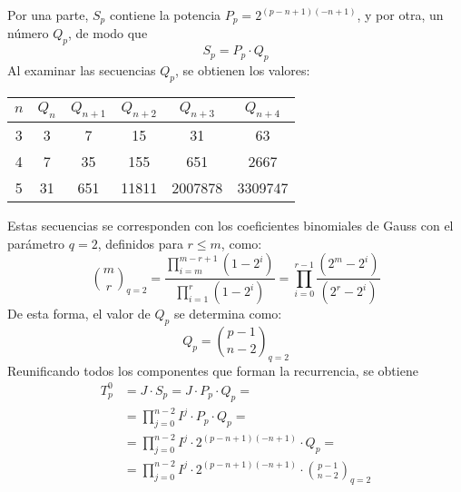 %
Por una parte, $S_p$ contiene la potencia $P_p = 2^{(p-n+1)(-n+1)}$, y por otra, 
un número $Q_p$, de modo que
$$ S_p = P_p \cdot Q_p$$
%
Al examinar las secuencias $Q_p$, se obtienen los valores:
\begin{center}
	\begin{tabular}{cc *{4}{c}}
		\toprule
		$n$ & $Q_{n}$ & $Q_{n+1}$ & $Q_{n+2}$ & $Q_{n+3}$ & $Q_{n+4}$ \\
		\midrule
		3   & 3       & 7         & 15        & 31        & 63        \\
		4   & 7       & 35        & 155       & 651       & 2667      \\
		5   & 31      & 651       & 11811     & 2007878   & 3309747   \\
		\bottomrule
	\end{tabular}
\end{center}
%
Estas secuencias se corresponden con los coeficientes binomiales de Gauss con el 
parámetro $q=2$, definidos para $r\leq m$, como:
$$
	{m \choose r}_{q=2} = \frac
		{\prod_{i=m}^{m-r+1}{(1-2^i)}}
		{\prod_{i=1}^{r}{(1-2^i)}} =
	\prod_{i = 0}^{r-1}{\frac
		{(2^m-2^i)}
		{(2^r-2^i)}}
$$
De esta forma, el valor de $Q_p$ se determina como:
$$
Q_p = {p-1 \choose n-2}_{q=2}
$$
%
Reunificando todos los componentes que forman la recurrencia, se obtiene
\begin{equation}
\label{eq_T}
\begin{split}
	T^0_p &= J \cdot S_p = J \cdot P_p \cdot Q_p = \\
	&= \prod^{n-2}_{j=0} I^j \cdot P_p \cdot Q_p = \\
	&= \prod^{n-2}_{j=0} I^j \cdot 2^{(p-n+1)(-n+1)} \cdot Q_p = \\
	&= \prod^{n-2}_{j=0} I^j \cdot 2^{(p-n+1)(-n+1)} \cdot {p-1 \choose n-2}_{q=2}
\end{split}
\end{equation}
%
